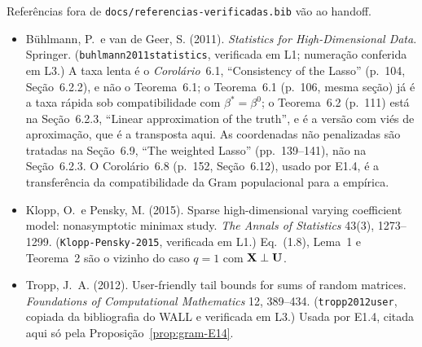 \documentclass[11pt,a4paper]{article}
\begin{document}
Referências fora de \texttt{docs/referencias-verificadas.bib} vão ao handoff.

\begin{itemize}[nosep, leftmargin=*]
  \item Bühlmann, P.\ e van de Geer, S. (2011). \emph{Statistics for
    High-Dimensional Data}. Springer. (\texttt{buhlmann2011statistics},
    verificada em L1; numeração conferida em L3.) A taxa lenta é o
    \emph{Corolário}~6.1, ``Consistency of the Lasso'' (p.~104, Seção~6.2.2),
    e não o Teorema~6.1; o Teorema~6.1 (p.~106, mesma seção) já é a taxa
    rápida sob compatibilidade com $\beta^{*} = \beta^{0}$; o Teorema~6.2
    (p.~111) está na Seção~6.2.3, ``Linear approximation of the truth'', e é a
    versão com viés de aproximação, que é a transposta aqui. As coordenadas
    não penalizadas são tratadas na Seção~6.9, ``The weighted Lasso''
    (pp.~139--141), não na Seção~6.2.3. O Corolário~6.8 (p.~152, Seção~6.12),
    usado por E1.4, é a transferência da compatibilidade da Gram populacional
    para a empírica.
  \item Klopp, O.\ e Pensky, M. (2015). Sparse high-dimensional varying
    coefficient model: nonasymptotic minimax study. \emph{The Annals of
    Statistics} 43(3), 1273--1299. (\texttt{Klopp-Pensky-2015}, verificada em
    L1.) Eq.~(1.8), Lema~1 e Teorema~2 são o vizinho do caso $q = 1$ com
    $\mathbf{X} \perp \mathbf{U}$.
  \item Tropp, J.~A. (2012). User-friendly tail bounds for sums of random
    matrices. \emph{Foundations of Computational Mathematics} 12, 389--434.
    (\texttt{tropp2012user}, copiada da bibliografia do WALL e verificada em
    L3.) Usada por E1.4, citada aqui só pela
    Proposição~\ref{prop:gram-E14}.
\end{itemize}
\end{document}
